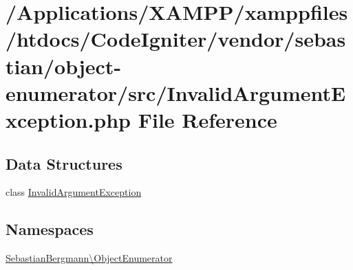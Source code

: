 \hypertarget{sebastian_2object-enumerator_2src_2_invalid_argument_exception_8php}{}\section{/\+Applications/\+X\+A\+M\+P\+P/xamppfiles/htdocs/\+Code\+Igniter/vendor/sebastian/object-\/enumerator/src/\+Invalid\+Argument\+Exception.php File Reference}
\label{sebastian_2object-enumerator_2src_2_invalid_argument_exception_8php}
\subsection*{Data Structures}
\begin{DoxyCompactItemize}
\item 
class \mbox{\hyperlink{class_sebastian_bergmann_1_1_object_enumerator_1_1_invalid_argument_exception}{Invalid\+Argument\+Exception}}
\end{DoxyCompactItemize}
\subsection*{Namespaces}
\begin{DoxyCompactItemize}
\item 
 \mbox{\hyperlink{namespace_sebastian_bergmann_1_1_object_enumerator}{Sebastian\+Bergmann\textbackslash{}\+Object\+Enumerator}}
\end{DoxyCompactItemize}
